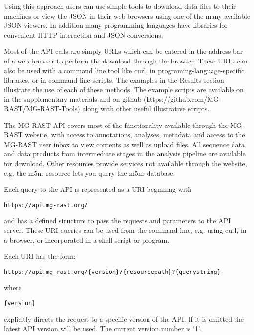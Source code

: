 Using this approach users can use simple tools to download data files to their machines or view the JSON in their web browsers using one of the many available JSON viewers. In addition many programming languages have libraries for convenient HTTP interaction and JSON conversions. 

Most of the API calls are simply URLs which can be entered in the address bar of a web browser to perform the download through the browser. These URLs can also be used with a command line tool like curl, in programing-language-specific libraries, or in command line scripts. The examples in the Results section illustrate the use of each of these methods. The example scripts are available on in the supplementary materials and on github (https://github.com/MG-RAST/MG-RAST-Tools) along with other useful illustrative scripts.

The MG-RAST API covers most of the functionality available through the MG-RAST website, with access to annotations, analyses, metadata and access to the MG-RAST user inbox to view contents as well as upload files. All sequence data and data products from intermediate stages in the analysis pipeline are available for download. Other resources provide services not available through the website, e.g. the m5nr resource lets you query the m5nr database.

Each query to the API is represented as a URI beginning with 
\begin{small}
\begin{verbatim}
https://api.mg-rast.org/
\end{verbatim}
\end{small} and has a defined structure to pass the requests and parameters to the API server. These URI queries can be used from the command line, e.g. using curl, in a browser, or incorporated in a shell script or program.

Each URI has the form:
\begin{small}
\begin{verbatim}
https://api.mg-rast.org/{version}/{resourcepath}?{querystring}
\end{verbatim}
\end{small} where

\begin{small}
\begin{verbatim}
{version}
\end{verbatim}
\end{small}
explicitly directs the request to a specific version of the API. If it is omitted the latest API version will be used. The current version number is `1'.

